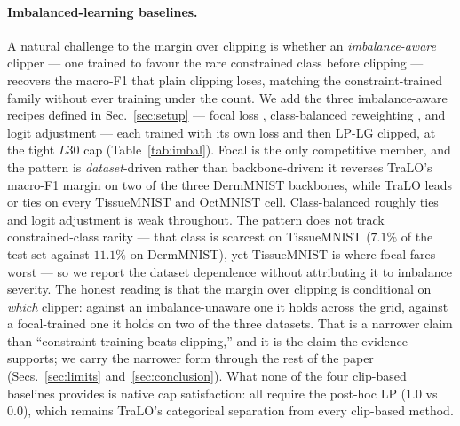 \documentclass[10pt]{article}
\begin{document}
{\paragraph{Imbalanced-learning baselines.}
A natural challenge to the margin over clipping is whether an \emph{imbalance-aware}
clipper --- one trained to favour the rare constrained class before clipping ---
recovers the macro-F1 that plain clipping loses, matching the constraint-trained
family without ever training under the count. We add the three imbalance-aware recipes
defined in Sec.~\ref{sec:setup} --- focal loss \citep{lin2017focal}, class-balanced
reweighting \citep{cui2019class}, and logit adjustment \citep{menon2020long} --- each
trained with its own loss and then LP-LG clipped, at the tight $L30$ cap
(Table~\ref{tab:imbal}). Focal is the only competitive member, and the pattern is
\emph{dataset}-driven rather than backbone-driven: it reverses TraLO's macro-F1 margin on
two of the three DermMNIST backbones, while TraLO leads or ties on every TissueMNIST and
OctMNIST cell. Class-balanced roughly ties and logit adjustment is weak throughout. The
pattern does not track constrained-class rarity --- that class is scarcest on TissueMNIST
($7.1\%$ of the test set against $11.1\%$ on DermMNIST), yet TissueMNIST is where focal
fares worst --- so we report the dataset dependence without attributing it to imbalance
severity. The honest reading is that the margin over clipping is conditional on
\emph{which} clipper: against an imbalance-unaware one it holds across the grid, against a
focal-trained one it holds on two of the three datasets. That is a narrower claim than
``constraint training beats clipping,'' and it is the claim the evidence supports; we carry
the narrower form through the rest of the paper (Secs.~\ref{sec:limits}
and~\ref{sec:conclusion}).
What none of the four clip-based baselines provides is
native cap satisfaction: all require the post-hoc LP ($1.0$ vs $0.0$), which remains
TraLO's categorical separation from every clip-based method.}
\end{document}
